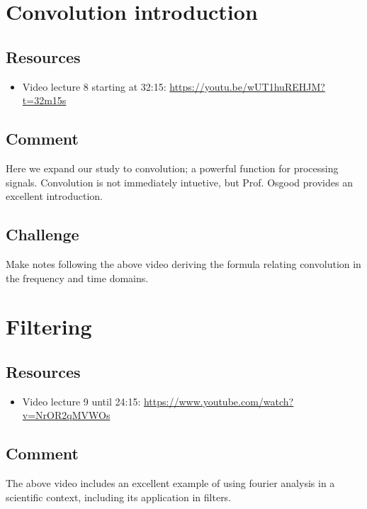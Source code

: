 \newpage
\section{Convolution introduction}

\subsection*{Resources}
\begin{itemize}
    \item Video lecture 8 starting at 32:15: \url{https://youtu.be/wUT1huREHJM?t=32m15s}
\end{itemize}

\subsection*{Comment}
Here we expand our study to convolution; a powerful function for processing signals. Convolution is not immediately intuetive, but Prof. Osgood provides an excellent introduction.

\subsection*{Challenge}
Make notes following the above video deriving the formula relating convolution in the frequency and time domains.




\newpage
\section{Filtering}

\subsection*{Resources}
\begin{itemize}
    \item Video lecture 9 until 24:15: \url{https://www.youtube.com/watch?v=NrOR2qMVWOs}
\end{itemize}

\subsection*{Comment}
The above video includes an excellent example of using fourier analysis in a scientific context, including its application in filters.

